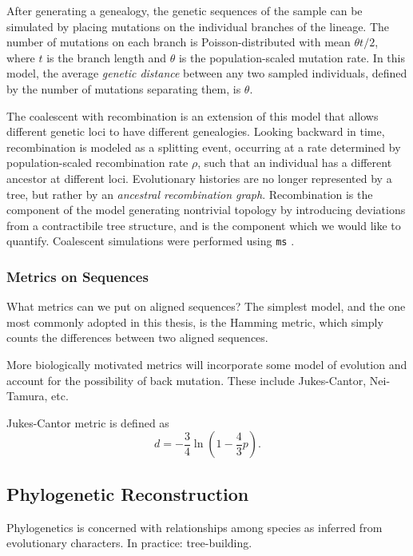 After generating a genealogy, the genetic sequences of the sample can be simulated by placing mutations on the individual branches of the lineage.
The number of mutations on each branch is Poisson-distributed with mean $\theta t / 2$, where $t$ is the branch length and $\theta$ is the population-scaled mutation rate.
In this model, the average \emph{genetic distance} between any two sampled individuals, defined by the number of mutations separating them, is $\theta$.

The coalescent with recombination is an extension of this model that allows different genetic loci to have different genealogies.
Looking backward in time, recombination is modeled as a splitting event, occurring at a rate determined by population-scaled recombination rate $\rho$, such that an individual has a different ancestor at different loci.
Evolutionary histories are no longer represented by a tree, but rather by an \emph{ancestral recombination graph}.
Recombination is the component of the model generating nontrivial topology by introducing deviations from a contractibile tree structure, and is the component which we would like to quantify.
Coalescent simulations were performed using \texttt{ms} \cite{Hudson:2002}.

\subsubsection{Metrics on Sequences}

What metrics can we put on aligned sequences?
The simplest model, and the one most commonly adopted in this thesis, is the Hamming metric, which simply counts the differences between two aligned sequences.

More biologically motivated metrics will incorporate some model of evolution and account for the possibility of back mutation.
These include Jukes-Cantor, Nei-Tamura, etc.

Jukes-Cantor metric is defined as 
\begin{equation}
d=-\frac{3}{4}\ln(1-\frac{4}{3}p).
\end{equation}

\subsection{Phylogenetic Reconstruction}

Phylogenetics is concerned with relationships among species as inferred from evolutionary characters.
In practice: tree-building.

